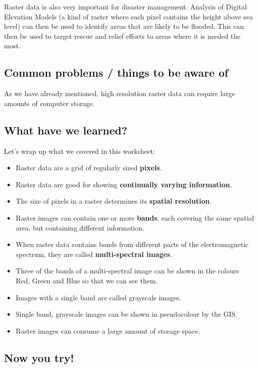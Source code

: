Raster data is also very important for disaster management. Analysis of
Digital Elevation Models (a kind of raster where each pixel contains the
height above sea level) can then be used to identify areas that are likely to
be flooded. This can then be used to target rescue and relief efforts to
areas where it is needed the most.

\subsection{Common problems / things to be aware of}

As we have already mentioned, high resolution raster data can require large
amounts of computer storage.

\subsection{What have we learned?}

Let's wrap up what we covered in this worksheet:

\begin{itemize}
\item Raster data are a grid of regularly sized \textbf{pixels}.
\item Raster data are good for showing \textbf{continually varying
information}.
\item The size of pixels in a raster determines its \textbf{spatial
resolution}.
\item Raster images can contain one or more \textbf{bands}, each covering the
same spatial area, but containing different information.
\item When raster data contains bands from different parts of the electromagnetic
spectrum, they are called \textbf{multi-spectral images}.
\item Three of the bands of a multi-spectral image can be shown in the colours Red,
Green and Blue so that we can see them.
\item Images with a single band are called grayscale images.
\item Single band, grayscale images can be shown in pseudocolour by the GIS.
\item Raster images can consume a large amount of storage space.
\end{itemize}

\subsection{Now you try!}

